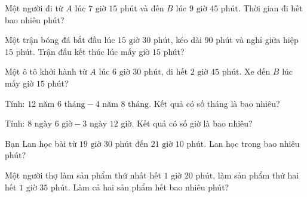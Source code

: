 \begin{ex}
  Một người đi từ $A$ lúc $7\text{ giờ } 15\text{ phút}$ và đến $B$ lúc $9\text{ giờ } 45\text{ phút}$. Thời gian đi hết bao nhiêu phút?
\end{ex}

\begin{ex}
  Một trận bóng đá bắt đầu lúc $15\text{ giờ } 30\text{ phút}$, kéo dài $90$ phút và nghỉ giữa hiệp $15$ phút. Trận đấu kết thúc lúc mấy giờ $15$ phút?
\end{ex}

\begin{ex}
  Một ô tô khởi hành từ $A$ lúc $6\text{ giờ } 30\text{ phút}$, đi hết $2\text{ giờ } 45\text{ phút}$. Xe đến $B$ lúc mấy giờ $15$ phút?
\end{ex}

\begin{ex}
  Tính: $12\text{ năm } 6\text{ tháng} - 4\text{ năm } 8\text{ tháng}$. Kết quả có số tháng là bao nhiêu?
\end{ex}

\begin{ex}
  Tính: $8\text{ ngày } 6\text{ giờ} - 3\text{ ngày } 12\text{ giờ}$. Kết quả có số giờ là bao nhiêu?
\end{ex}

\begin{ex}
  Bạn Lan học bài từ $19\text{ giờ } 30\text{ phút}$ đến $21\text{ giờ } 10\text{ phút}$. Lan học trong bao nhiêu phút?
\end{ex}

\begin{ex}
  Một người thợ làm sản phẩm thứ nhất hết $1\text{ giờ } 20\text{ phút}$, làm sản phẩm thứ hai hết $1\text{ giờ } 35\text{ phút}$. Làm cả hai sản phẩm hết bao nhiêu phút?
\end{ex}

